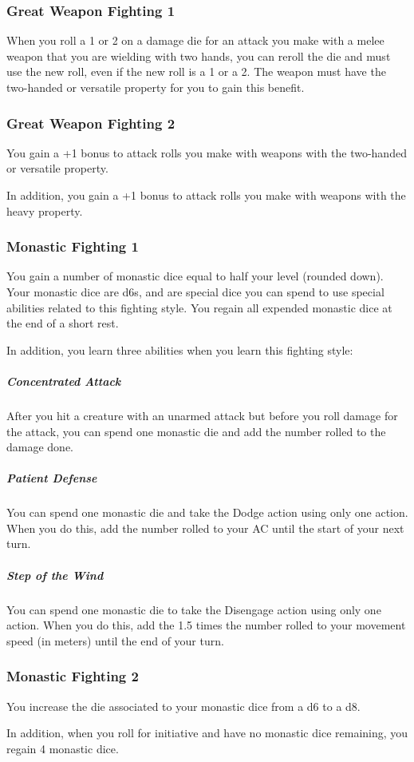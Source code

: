     \subsubsection{Great Weapon Fighting 1}
        When you roll a 1 or 2 on a damage die for an attack you make with a melee weapon that you are wielding with two hands, you can reroll the die and must use the new roll, even if the new roll is a 1 or a 2.
        The weapon must have the two-handed or versatile property for you to gain this benefit.
    \subsubsection{Great Weapon Fighting 2}
        You gain a +1 bonus to attack rolls you make with weapons with the two-handed or versatile property.

        In addition, you gain a +1 bonus to attack rolls you make with weapons with the heavy property.
    \subsubsection{Monastic Fighting 1}
        You gain a number of monastic dice equal to half your level (rounded down).
        Your monastic dice are d6s, and are special dice you can spend to use special abilities related to this fighting style.
        You regain all expended monastic dice at the end of a short rest.

        In addition, you learn three abilities when you learn this fighting style:
        \subparagraph{Concentrated Attack} After you hit a creature with an unarmed attack but before you roll damage for the attack, you can spend one monastic die and add the number rolled to the damage done.
        \subparagraph{Patient Defense} You can spend one monastic die and take the Dodge action using only one action.
        When you do this, add the number rolled to your AC until the start of your next turn.
        \subparagraph{Step of the Wind} You can spend one monastic die to take the Disengage action using only one action.
        When you do this, add the 1.5 times the number rolled to your movement speed (in meters) until the end of your turn.
    \subsubsection{Monastic Fighting 2}
        You increase the die associated to your monastic dice from a d6 to a d8.

        In addition, when you roll for initiative and have no monastic dice remaining, you regain 4 monastic dice.
